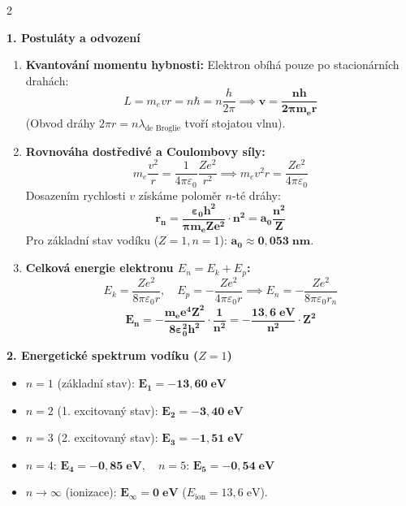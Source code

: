 \documentclass[9pt,a4paper]{article}
\begin{document}
\begin{tcolorbox}[secbox,title=4. BOHRŮV MODEL ATOMU VODÍKU A SPEKTRÁLNÍ PŘECHODY]
\begin{multicols}{2}

\textbf{\large 1. Postuláty a odvození}
\begin{enumerate}
  \item \textbf{Kvantování momentu hybnosti:}
  Elektron obíhá pouze po stacionárních drahách:
  \[L = m_e v r = n \hbar = n \frac{h}{2\pi} \implies \mathbf{v = \frac{nh}{2\pi m_e r}}\]
  (Obvod dráhy $2\pi r = n\lambda_{\text{de Broglie}}$ tvoří stojatou vlnu).
  \item \textbf{Rovnováha dostředivé a Coulombovy síly:}
  \[m_e \frac{v^2}{r} = \frac{1}{4\pi\varepsilon_0}\frac{Ze^2}{r^2} \implies m_e v^2 r = \frac{Ze^2}{4\pi\varepsilon_0}\]
  Dosazením rychlosti $v$ získáme poloměr $n$-té dráhy:
  \[\mathbf{r_n = \frac{\varepsilon_0 h^2}{\pi m_e Z e^2} \cdot n^2 = a_0 \frac{n^2}{Z}}\]
  Pro základní stav vodíku ($Z=1, n=1$): $\mathbf{a_0 \approx 0{,}053\;\text{nm}}$.
  \item \textbf{Celková energie elektronu $E_n = E_k + E_p$:}
  \[E_k = \frac{Ze^2}{8\pi\varepsilon_0 r}, \quad E_p = -\frac{Ze^2}{4\pi\varepsilon_0 r} \implies E_n = -\frac{Ze^2}{8\pi\varepsilon_0 r_n}\]
  \[\mathbf{E_n = - \frac{m_e e^4 Z^2}{8\varepsilon_0^2 h^2} \cdot \frac{1}{n^2} = - \frac{13{,}6\;\text{eV}}{n^2} \cdot Z^2}\]
\end{enumerate}

\textbf{\large 2. Energetické spektrum vodíku ($Z=1$)}
\begin{itemize}
  \item $n=1$ (základní stav): $\mathbf{E_1 = -13{,}60\;\text{eV}}$
  \item $n=2$ (1. excitovaný stav): $\mathbf{E_2 = -3{,}40\;\text{eV}}$
  \item $n=3$ (2. excitovaný stav): $\mathbf{E_3 = -1{,}51\;\text{eV}}$
  \item $n=4$: $\mathbf{E_4 = -0{,}85\;\text{eV}}, \quad n=5$: $\mathbf{E_5 = -0{,}54\;\text{eV}}$
  \item $n \to \infty$ (ionizace): $\mathbf{E_\infty = 0\;\text{eV}}$ ($E_{\text{ion}} = 13{,}6\;\text{eV}$).
\end{itemize}

\columnbreak


\end{multicols}
\end{tcolorbox}
\end{document}
